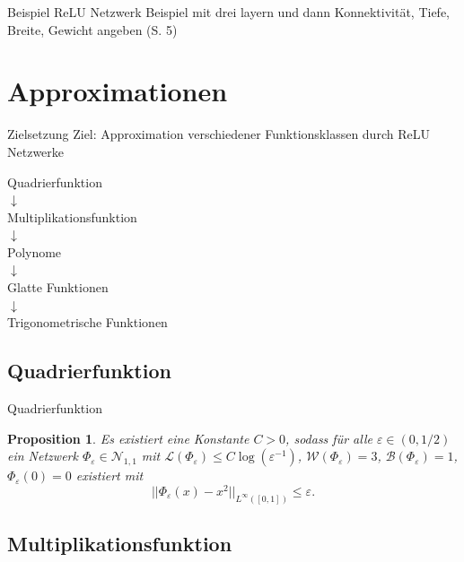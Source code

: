 \documentclass[10pt,aspectratio=169]{beamer}
\newtheorem{proposition}[theorem]{Proposition}
\begin{document}
\begin{frame}{Beispiel ReLU Netzwerk}
    Beispiel mit drei layern und dann Konnektivität, Tiefe, Breite, Gewicht angeben (S. 5)
\end{frame}

\section{Approximationen}

\begin{frame}{Zielsetzung}
    Ziel: Approximation verschiedener Funktionsklassen durch ReLU Netzwerke

    \begin{center}
        Quadrierfunktion \\ \pause
        \(\downarrow\) \\
        Multiplikationsfunktion \\ \pause
        \(\downarrow\) \\
        Polynome \\ \pause
        \(\downarrow\) \\
        Glatte Funktionen \\ \pause
        \(\downarrow\) \\
        Trigonometrische Funktionen
    \end{center}
\end{frame}

\subsection{Quadrierfunktion}

\begin{frame}{Quadrierfunktion}
    \begin{proposition} %
        Es existiert eine Konstante \(C>0\), sodass für alle \(\varepsilon \in (0,1/2)\) 
        ein Netzwerk \(\Phi_\varepsilon \in \mathcal{N}_{1,1}\) mit 
        \(\mathcal{L}(\Phi_\varepsilon) \leq C\log(\varepsilon^{-1})\), 
        \(\mathcal{W}(\Phi_\varepsilon) = 3\), \(\mathcal{B}(\Phi_\varepsilon) = 1\), 
        \(\Phi_\varepsilon(0) = 0\) existiert mit 
        \[ ||\Phi_\varepsilon(x) - x^2 ||_{L^\infty([0,1])} \leq \varepsilon. \]
    \end{proposition}
\end{frame}

\subsection{Multiplikationsfunktion}
\end{document}
